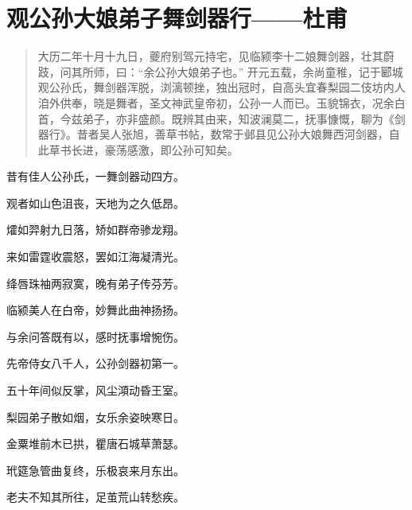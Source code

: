 \section{观公孙大娘弟子舞剑器行——杜甫}
\begin{quotation}
大历二年十月十九日，夔府别驾元持宅，见临颍李十二娘舞剑器，壮其蔚跂，问其所师，曰：“余公孙大娘弟子也。” 开元五载，余尚童稚，记于郾城观公孙氏，舞剑器浑脱，浏漓顿挫，独出冠时，自高头宜春梨园二伎坊内人洎外供奉，晓是舞者，圣文神武皇帝初，公孙一人而已。玉貌锦衣，况余白首，今兹弟子，亦非盛颜。既辨其由来，知波澜莫二，抚事慷慨，聊为《剑器行》。昔者吴人张旭，善草书帖，数常于邺县见公孙大娘舞西河剑器，自此草书长进，豪荡感激，即公孙可知矣。
\end{quotation}

昔有佳人公孙氏，一舞剑器动四方。

观者如山色沮丧，天地为之久低昂。

㸌如羿射九日落，矫如群帝骖龙翔。

来如雷霆收震怒，罢如江海凝清光。

绛唇珠袖两寂寞，晚有弟子传芬芳。

临颍美人在白帝，妙舞此曲神扬扬。

与余问答既有以，感时抚事增惋伤。

先帝侍女八千人，公孙剑器初第一。

五十年间似反掌，风尘澒动昏王室。

梨园弟子散如烟，女乐余姿映寒日。

金粟堆前木已拱，瞿唐石城草萧瑟。

玳筵急管曲复终，乐极哀来月东出。

老夫不知其所往，足茧荒山转愁疾。